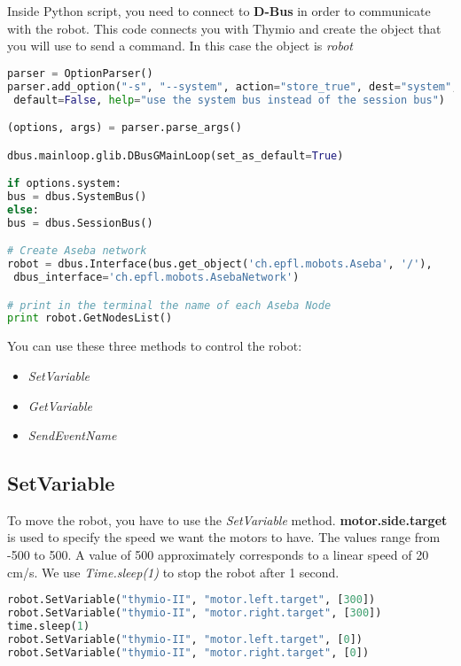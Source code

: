 \documentclass[12pt]{article}%
\begin{document}
	Inside Python script, you need to connect to \textbf{D-Bus} in order to communicate with the robot. 
	This code connects you with Thymio and create the object that you will use to send a command. 
	In this case the object is \textit{robot}
	
	\begin{lstlisting}[language=Python]
parser = OptionParser()
parser.add_option("-s", "--system", action="store_true", dest="system",
 default=False, help="use the system bus instead of the session bus")

(options, args) = parser.parse_args()

dbus.mainloop.glib.DBusGMainLoop(set_as_default=True)

if options.system:
bus = dbus.SystemBus()
else:
bus = dbus.SessionBus()

# Create Aseba network
robot = dbus.Interface(bus.get_object('ch.epfl.mobots.Aseba', '/'),
 dbus_interface='ch.epfl.mobots.AsebaNetwork')

# print in the terminal the name of each Aseba Node
print robot.GetNodesList()
	\end{lstlisting}
	
	You can use these three methods to control the robot:
	\begin{itemize}
		\item \textit{SetVariable}
		\item \textit{GetVariable}
		\item \textit{SendEventName}
	\end{itemize}

	
	
	\subsection{SetVariable}
	
		To move the robot, you have to use the \textit{SetVariable} method.
		\textbf{motor.side.target} is used to specify the speed we want the motors to have.
		The values range from -500 to 500.
		A value of 500 approximately corresponds to a linear speed of 20 cm/s.
		We use \textit{Time.sleep(1)} to stop the robot after 1 second.
		
		\begin{lstlisting}[language=Python]
robot.SetVariable("thymio-II", "motor.left.target", [300])
robot.SetVariable("thymio-II", "motor.right.target", [300])
time.sleep(1)
robot.SetVariable("thymio-II", "motor.left.target", [0])
robot.SetVariable("thymio-II", "motor.right.target", [0])
		\end{lstlisting}
\end{document}

